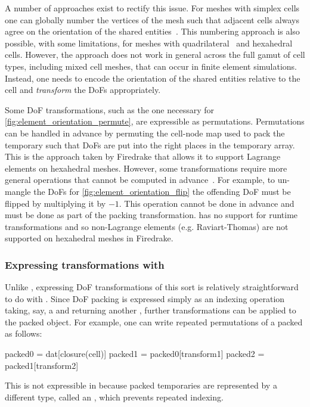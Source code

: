 \documentclass[thesis]{subfiles}
\begin{document}
A number of approaches exist to rectify this issue.
For meshes with simplex cells one can globally number the vertices of the mesh such that adjacent cells always agree on the orientation of the shared entities~\cite{rognesEfficientAssemblyDiv2010}.
This numbering approach is also possible, with some limitations, for meshes with quadrilateral~\cite{homolyaParallelEdgeOrientation2016} and hexahedral~\cite{agelekOrientingEdgesUnstructured2017} cells.
However, the approach does not work in general across the full gamut of cell types, including mixed cell meshes, that can occur in finite element simulations.
Instead, one needs to encode the orientation of the shared entities relative to the cell and \emph{transform} the DoFs appropriately.

Some DoF transformations, such as the one necessary for \cref{fig:element_orientation_permute}, are expressible as permutations.
Permutations can be handled in advance by permuting the cell-node map used to pack the temporary such that DoFs are put into the right places in the temporary array.
This is the approach taken by Firedrake that allows it to support Lagrange elements on hexahedral meshes.
However, some transformations require more general operations that cannot be computed in advance~\cite{scroggsBasixRuntimeFinite2022,scroggsConstructionArbitraryOrder2021}.
For example, to un-mangle the DoFs for \cref{fig:element_orientation_flip} the offending DoF must be flipped by multiplying it by $-1$.
This operation cannot be done in advance and must be done as part of the packing transformation.
 has no support for runtime transformations and so non-Lagrange elements (e.g. Raviart-Thomas) are not supported on hexahedral meshes in Firedrake.

\subsubsection{Expressing transformations with }
\label{sec:firedrake_orientations_pyop3}

Unlike , expressing DoF transformations of this sort is relatively straightforward to do with .
Since DoF packing is expressed simply as an indexing operation taking, say, a  and returning another , further transformations can be applied to the packed object.
For example, one can write repeated permutations of a packed  as follows:
\begin{pyinline}
  packed0 = dat[closure(cell)]
  packed1 = packed0[transform1]
  packed2 = packed1[transform2]
\end{pyinline}
This is not expressible in  because packed temporaries are represented by a different type, called an , which prevents repeated indexing.
\end{document}
